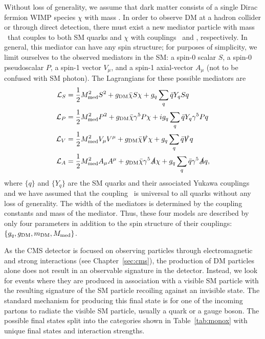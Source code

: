 Without loss of generality, we assume that dark matter consists of a single Dirac fermion WIMP species $\chi$ with mass \mdm. 
In order to observe DM at a hadron collider or through direct detection, there must exist a new mediator particle with mass \mmed\ that couples to both SM quarks and $\chi$ with couplings \gq\ and \gdm, respectively.
In general, this mediator can have any spin structure; for purposes of simplicity, we limit ourselves to the observed mediators in the SM: a spin-0 scalar $S$, a spin-0 pseudoscalar $P$, a spin-1 vector $V_\mu$, and a spin-1 axial-vector $A_\mu$ (not to be confused with SM photon). %
The Lagrangians for these possible mediators are
\begin{align}
  \mathcal{L}_{S} & = \frac{1}{2} M_{\text{med}}^2 S^2 + g_{\text{DM}} \bar \chi S \chi + g_{{q}} \sum\limits_q \bar q Y_q S q \\
  \mathcal{L}_{P} & = \frac{1}{2} M_{\text{med}}^2 P^2 + g_{\text{DM}} \bar \chi \gamma^5 P \chi + i g_{{q}} \sum\limits_q \bar q Y_q \gamma^5 P q \\
  \mathcal{L}_{V} & = \frac{1}{2} M_{\text{med}}^2 V_\mu V^\mu + g_{\text{DM}} \bar \chi \slashed V \chi + g_{{q}} \sum\limits_q \bar q \slashed V q \\
  \mathcal{L}_{A} & = \frac{1}{2} M_{\text{med}}^2 A_\mu A^\mu + g_{\text{DM}} \bar \chi \gamma^5 \slashed A \chi + g_{{q}} \sum\limits_q \bar q \gamma^5 \slashed A q ,
\end{align}
where $\{q\}$ and $\{Y_q\}$ are the SM quarks and their associated Yukawa couplings and we have assumed that the coupling \gq\ is universal to all quarks without any loss of generality.
The width of the mediators is determined by the coupling constants and mass of the mediator.
Thus, these four models are described by only four parameters in addition to the spin structure of their couplings: $\{g_{{q}}, g_{\text{DM}}, m_{\text{DM}}, M_{\text{med}}\}$. %

As the CMS detector is focused on observing particles through electromagnetic and strong interactions (see Chapter~\ref{sec:cms}), the production of DM particles alone does not result in an observable signature in the detector.
Instead, we look for events where they are produced in association with a visible SM particle with the resulting signature of the SM particle recoiling against an invisible state.
The standard mechanism for producing this final state is for one of the incoming partons to radiate the visible SM particle, usually a quark or a gauge boson.%
The possible final states split into the categories shown in Table~\ref{tab:monox} with unique final states and interaction strengths.


